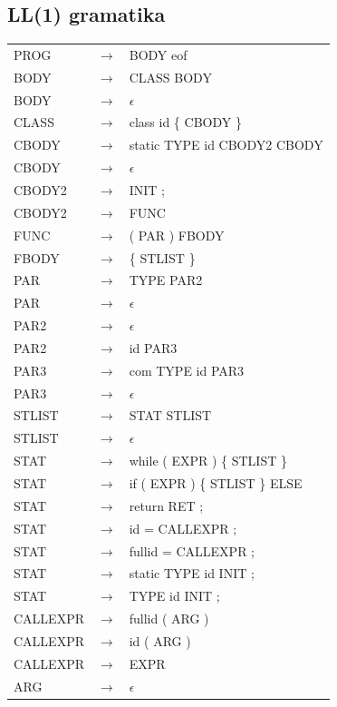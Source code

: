 \documentclass[11pt,a4paper]{article}
\begin{document}
	\subsection{LL(1) gramatika}
	\label{gramatika}
	\begin{tabular}{l c l}
		PROG & $\rightarrow$ & BODY eof \\
		BODY & $\rightarrow$ & CLASS BODY \\
		BODY & $\rightarrow$ & $\epsilon$ \\
		CLASS & $\rightarrow$& class id \{ CBODY \} \\
		CBODY &$\rightarrow$& static TYPE id CBODY2 CBODY \\
		CBODY &$\rightarrow$& $\epsilon$ \\
		CBODY2 &$\rightarrow$& INIT ; \\
		CBODY2 &$\rightarrow$& FUNC \\
		FUNC &$\rightarrow$& ( PAR ) FBODY \\
		FBODY &$\rightarrow$& \{ STLIST \} \\
		PAR &$\rightarrow$& TYPE PAR2 \\
		PAR &$\rightarrow$& $\epsilon$ \\
		PAR2 &$\rightarrow$& $\epsilon$ \\
		PAR2 &$\rightarrow$& id PAR3 \\
		PAR3 &$\rightarrow$& com TYPE id PAR3 \\
		PAR3 &$\rightarrow$& $\epsilon$ \\
		STLIST &$\rightarrow$& STAT STLIST \\
		STLIST &$\rightarrow$&  $\epsilon$ \\
		STAT &$\rightarrow$& while ( EXPR ) \{ STLIST \} \\
		STAT &$\rightarrow$& if ( EXPR ) \{ STLIST \} ELSE \\
		STAT &$\rightarrow$& return RET ; \\
		STAT &$\rightarrow$& id = CALLEXPR ; \\
		STAT &$\rightarrow$& fullid = CALLEXPR ; \\
		STAT &$\rightarrow$& static TYPE id INIT ; \\
		STAT &$\rightarrow$& TYPE id INIT ; \\
		CALLEXPR &$\rightarrow$& fullid ( ARG ) \\
		CALLEXPR &$\rightarrow$& id ( ARG ) \\
		CALLEXPR &$\rightarrow$& EXPR \\
		ARG &$\rightarrow$& $\epsilon$ \\

\end{tabular}
\end{document}
